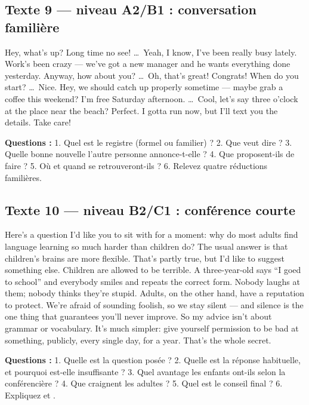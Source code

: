 \subsection{Texte 9 --- niveau A2/B1 : conversation familière}
\begin{dialoguebox}
\begin{anglais}
Hey, what's up? Long time no see! \ldots\ Yeah, I know, I've been really busy lately. Work's
been crazy --- we've got a new manager and he wants everything done yesterday. Anyway, how
about you? \ldots\ Oh, that's great! Congrats! When do you start? \ldots\ Nice. Hey, we
should catch up properly sometime --- maybe grab a coffee this weekend? I'm free Saturday
afternoon. \ldots\ Cool, let's say three o'clock at the place near the beach? Perfect.
I gotta run now, but I'll text you the details. Take care!
\end{anglais}
\end{dialoguebox}
\textbf{Questions :} 1. Quel est le registre (formel ou familier) ? 2. Que veut dire
 ? 3. Quelle bonne nouvelle l'autre personne annonce-t-elle ?
4. Que proposent-ils de faire ? 5. Où et quand se retrouveront-ils ?
6. Relevez quatre réductions familières.

\subsection{Texte 10 --- niveau B2/C1 : conférence courte}
\begin{dialoguebox}
\begin{anglais}
Here's a question I'd like you to sit with for a moment: why do most adults find language
learning so much harder than children do? The usual answer is that children's brains are
more flexible. That's partly true, but I'd like to suggest something else. Children are
allowed to be terrible. A three-year-old says ``I goed to school'' and everybody smiles and
repeats the correct form. Nobody laughs at them; nobody thinks they're stupid. Adults, on
the other hand, have a reputation to protect. We're afraid of sounding foolish, so we stay
silent --- and silence is the one thing that guarantees you'll never improve. So my advice
isn't about grammar or vocabulary. It's much simpler: give yourself permission to be bad at
something, publicly, every single day, for a year. That's the whole secret.
\end{anglais}
\end{dialoguebox}
\textbf{Questions :} 1. Quelle est la question posée ? 2. Quelle est la réponse habituelle,
et pourquoi est-elle insuffisante ? 3. Quel avantage les enfants ont-ils selon la conférencière ?
4. Que craignent les adultes ? 5. Quel est le conseil final ? 6. Expliquez
 et .

